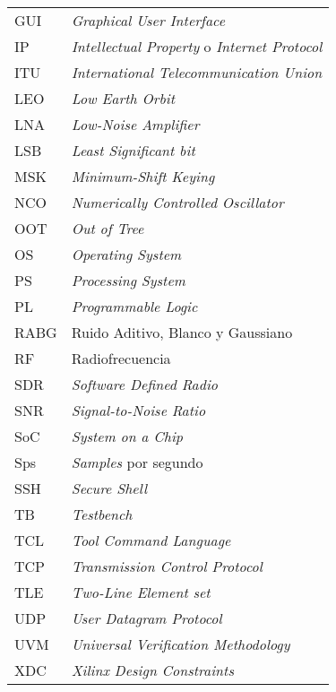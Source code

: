 \documentclass[screen, pagebackref,oneside]{ibtesis}
\begin{document}
\begin{preliminary}
\begin{abreviaturas}
\begin{longtable}{ll}
            GUI &   \textit{Graphical User Interface}   \\
            IP &    \textit{Intellectual Property} o \textit{Internet Protocol} \\
            ITU &   \textit{International Telecommunication Union} \\
            LEO &   \textit{Low Earth Orbit}        \\
            LNA &   \textit{Low-Noise Amplifier}    \\
            LSB &   \textit{Least Significant bit}  \\
            MSK &   \textit{Minimum-Shift Keying}  \\
            NCO &   \textit{Numerically Controlled Oscillator}  \\
            OOT &   \textit{Out of Tree}    \\
            OS  &   \textit{Operating System}   \\
            PS  &   \textit{Processing System}  \\
            PL  &   \textit{Programmable Logic} \\
            RABG &  Ruido Aditivo, Blanco y Gaussiano   \\
            RF  &   Radiofrecuencia                 \\
            SDR &   \textit{Software Defined Radio} \\
            SNR &   \textit{Signal-to-Noise Ratio}  \\
            SoC &   \textit{System on a Chip}       \\
            Sps &   \textit{Samples} por segundo   \\
            SSH &   \textit{Secure Shell}   \\
            TB  &   \textit{Testbench}  \\
            TCL &   \textit{Tool Command Language}  \\
            TCP &   \textit{Transmission Control Protocol}  \\
            TLE &   \textit{Two-Line Element set}   \\
            UDP &   \textit{User Datagram Protocol} \\
            UVM &   \textit{Universal Verification Methodology} \\
            XDC &   \textit{Xilinx Design Constraints}
        \end{longtable}
    \end{abreviaturas}
    
    \tableofcontents                %
    \listoffigures                  %
    \listoftables                   %
    
    
\end{preliminary}
\end{document}
